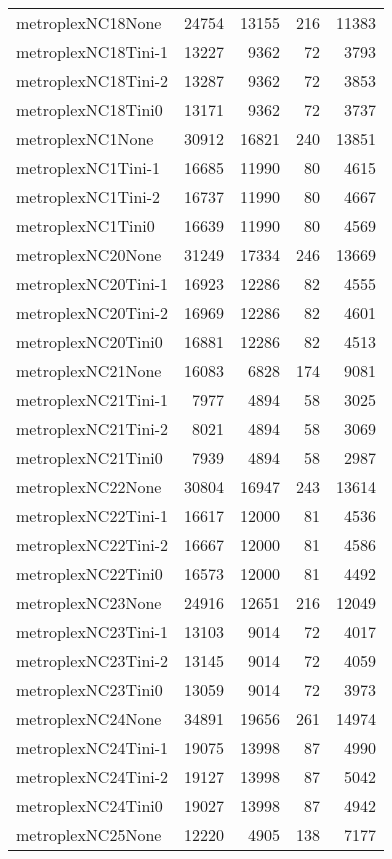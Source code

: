 \begin{longtable}{lrrrr}
metroplexNC18None & 24754 & 13155 & 216 & 11383 \\
metroplexNC18Tini-1 & 13227 & 9362 & 72 & 3793 \\
metroplexNC18Tini-2 & 13287 & 9362 & 72 & 3853 \\
metroplexNC18Tini0 & 13171 & 9362 & 72 & 3737 \\
metroplexNC1None & 30912 & 16821 & 240 & 13851 \\
metroplexNC1Tini-1 & 16685 & 11990 & 80 & 4615 \\
metroplexNC1Tini-2 & 16737 & 11990 & 80 & 4667 \\
metroplexNC1Tini0 & 16639 & 11990 & 80 & 4569 \\
metroplexNC20None & 31249 & 17334 & 246 & 13669 \\
metroplexNC20Tini-1 & 16923 & 12286 & 82 & 4555 \\
metroplexNC20Tini-2 & 16969 & 12286 & 82 & 4601 \\
metroplexNC20Tini0 & 16881 & 12286 & 82 & 4513 \\
metroplexNC21None & 16083 & 6828 & 174 & 9081 \\
metroplexNC21Tini-1 & 7977 & 4894 & 58 & 3025 \\
metroplexNC21Tini-2 & 8021 & 4894 & 58 & 3069 \\
metroplexNC21Tini0 & 7939 & 4894 & 58 & 2987 \\
metroplexNC22None & 30804 & 16947 & 243 & 13614 \\
metroplexNC22Tini-1 & 16617 & 12000 & 81 & 4536 \\
metroplexNC22Tini-2 & 16667 & 12000 & 81 & 4586 \\
metroplexNC22Tini0 & 16573 & 12000 & 81 & 4492 \\
metroplexNC23None & 24916 & 12651 & 216 & 12049 \\
metroplexNC23Tini-1 & 13103 & 9014 & 72 & 4017 \\
metroplexNC23Tini-2 & 13145 & 9014 & 72 & 4059 \\
metroplexNC23Tini0 & 13059 & 9014 & 72 & 3973 \\
metroplexNC24None & 34891 & 19656 & 261 & 14974 \\
metroplexNC24Tini-1 & 19075 & 13998 & 87 & 4990 \\
metroplexNC24Tini-2 & 19127 & 13998 & 87 & 5042 \\
metroplexNC24Tini0 & 19027 & 13998 & 87 & 4942 \\
metroplexNC25None & 12220 & 4905 & 138 & 7177 \\

\end{longtable}
